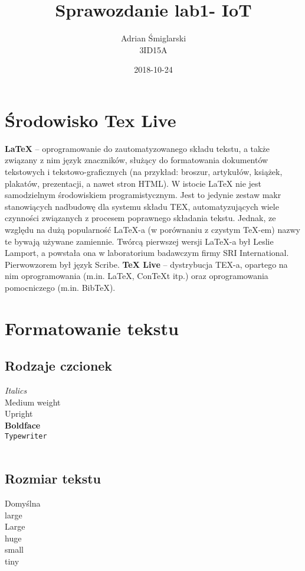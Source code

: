 \documentclass[a4paper,12pt]{article}
\title{\huge Sprawozdanie lab1- IoT }
\date{2018-10-24}
\author{Adrian Śmiglarski\\ 3ID15A}
\begin{document}
\maketitle
\newpage
\section{Środowisko Tex Live}
\textbf{LaTeX} – oprogramowanie do zautomatyzowanego składu tekstu, a także związany z nim język znaczników, służący do formatowania dokumentów tekstowych i tekstowo-graficznych (na przykład: broszur, artykułów, książek, plakatów, prezentacji, a nawet stron HTML). W istocie LaTeX nie jest samodzielnym środowiskiem programistycznym. Jest to jedynie zestaw makr stanowiących nadbudowę dla systemu składu TEX, automatyzujących wiele czynności związanych z procesem poprawnego składania tekstu. Jednak, ze względu na dużą popularność LaTeX-a (w porównaniu z czystym TeX-em) nazwy te bywają używane zamiennie. Twórcą pierwszej wersji LaTeX-a był Leslie Lamport, a powstała ona w laboratorium badawczym firmy SRI International. Pierwowzorem był język Scribe.
\newline\newline \textbf{TeX Live} – dystrybucja TEX-a, opartego na nim oprogramowania (m.in. LaTeX, ConTeXt itp.) oraz oprogramowania pomocniczego (m.in. BibTeX).

\section{Formatowanie tekstu}

\subsection{Rodzaje czcionek}
\textit{Italics} \\
\textmd{Medium weight} \\
\textup{Upright} \\
\textbf{Boldface} \\
\texttt{Typewriter} \\ \\ 

\subsection{Rozmiar tekstu}
\normalsize Domyślna \newline \\
\large large  \newline \\
\Large Large  \newline \\
\huge huge  \newline \\ 
\small small  \newline \\
\tiny tiny \newline \\
\end{document}
